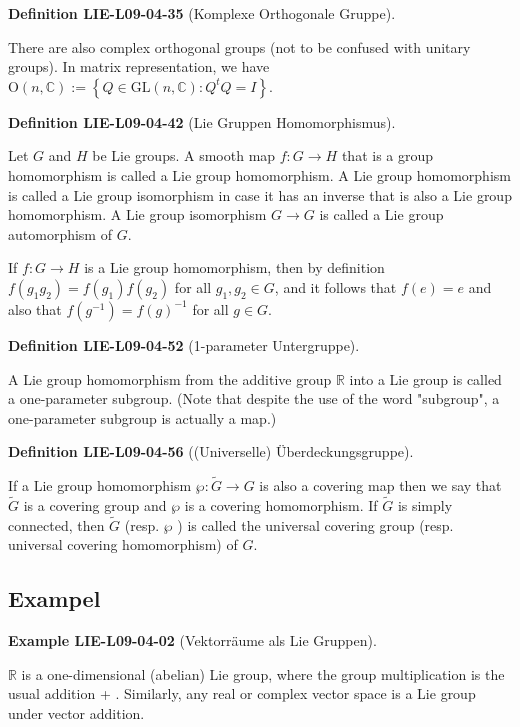 \documentclass[10pt, letterpaper]{article}
\newcommand{\CustomHeading}[3]{%
  \par\medskip\noindent%
  \textbf{#1 #2} \textnormal{(#3)}.\enskip%
}
\newenvironment{DEF}[2]{\CustomHeading{Definition}{#1}{#2}}{}
\newenvironment{EXA}[2]{\CustomHeading{Example}{#1}{#2}}{}
\begin{document}
\begin{DEF}{LIE-L09-04-35}{Komplexe Orthogonale Gruppe}
There are also complex orthogonal groups (not to be confused with unitary groups). In matrix representation, we have $\mathrm{O}(n, \mathbb{C}):= \left\{Q \in \mathrm{GL}(n, \mathbb{C}): Q^{t} Q=I\right\}$.
\end{DEF}

\begin{DEF}{LIE-L09-04-42}{Lie Gruppen Homomorphismus}
Let $G$ and $H$ be Lie groups. A smooth map $f: G \rightarrow H$ that is a group homomorphism is called a Lie group homomorphism. A Lie group homomorphism is called a Lie group isomorphism in case it has an inverse that is also a Lie group homomorphism. A Lie group isomorphism $G \rightarrow G$ is called a Lie group automorphism of $G$.

If $f: G \rightarrow H$ is a Lie group homomorphism, then by definition $f\left(g_{1} g_{2}\right)= f\left(g_{1}\right) f\left(g_{2}\right)$ for all $g_{1}, g_{2} \in G$, and it follows that $f(e)=e$ and also that $f\left(g^{-1}\right)=f(g)^{-1}$ for all $g \in G$.
\end{DEF}

\begin{DEF}{LIE-L09-04-52}{1-parameter Untergruppe}
A Lie group homomorphism from the additive group $\mathbb{R}$ into a Lie group is called a one-parameter subgroup. (Note that despite the use of the word "subgroup", a one-parameter subgroup is actually a map.)
\end{DEF}

\begin{DEF}{LIE-L09-04-56}{(Universelle) Überdeckungsgruppe}
If a Lie group homomorphism $\wp: \widetilde{G} \rightarrow G$ is also a covering map then we say that $\widetilde{G}$ is a covering group and $\wp$ is a covering homomorphism. If $\widetilde{G}$ is simply connected, then $\widetilde{G}$ (resp. $\wp$ ) is called the universal covering group (resp. universal covering homomorphism) of $G$.
\end{DEF}

\subsection{Exampel}

\begin{EXA}{LIE-L09-04-02}{Vektorräume als Lie Gruppen}
$\mathbb{R}$ is a one-dimensional (abelian) Lie group, where the group multiplication is the usual addition + . Similarly, any real or complex vector space is a Lie group under vector addition.
\end{EXA}
\end{document}
